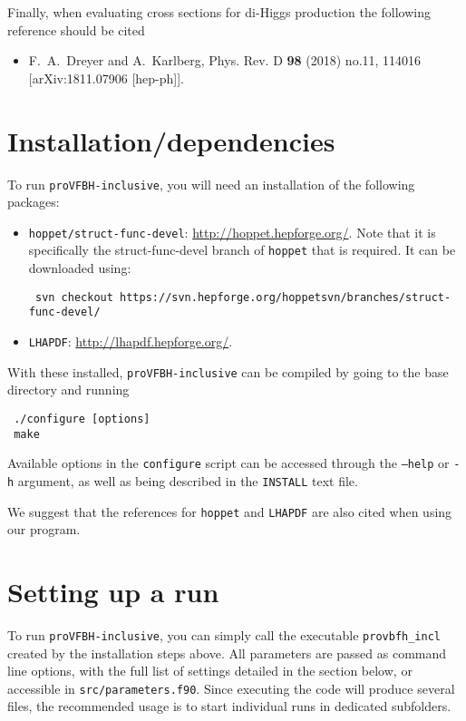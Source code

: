 \documentclass[12pt,a4]{article}
\newcommand{\provbfhincl}{\texttt{proVFBH-inclusive}\xspace}
\newcommand{\hoppet}{\texttt{hoppet}\xspace}
\begin{document}
Finally, when evaluating cross sections for di-Higgs production the following reference should be cited
\begin{itemize}
\item F.~A.~Dreyer and A.~Karlberg,
Phys. Rev. D \textbf{98} (2018) no.11, 114016
[arXiv:1811.07906 [hep-ph]].
\end{itemize}
\section{Installation/dependencies}
To run \provbfhincl, you will need an installation of the following packages:
\begin{itemize}
\item \texttt{hoppet/struct-func-devel}:
  \url{http://hoppet.hepforge.org/}.  Note that it is specifically the
  struct-func-devel branch of \hoppet that is required.  It can be
  downloaded using:
\begin{verbatim}
 svn checkout https://svn.hepforge.org/hoppetsvn/branches/struct-func-devel/
\end{verbatim}
\item \texttt{LHAPDF}: \url{http://lhapdf.hepforge.org/}.
\end{itemize}
With these installed, \provbfhincl can be compiled by going to the base
directory and running
\begin{verbatim}
 ./configure [options]
 make
\end{verbatim}
Available options in the \texttt{configure} script can be accessed
through the \texttt{--help} or \texttt{-h} argument, as well as being
described in the \texttt{INSTALL} text file.

We suggest that the references for \texttt{hoppet} and \texttt{LHAPDF}
are also cited when using our program.

\section{Setting up a run}
To run \provbfhincl, you can simply call the executable
\texttt{provbfh\_incl} created by the installation steps above.
%
All parameters are passed as command line options, with the full list
of settings detailed in the section below, or accessible in
\texttt{src/parameters.f90}.
%
Since executing the code will produce several files, the recommended
usage is to start individual runs in dedicated subfolders.
\end{document}
